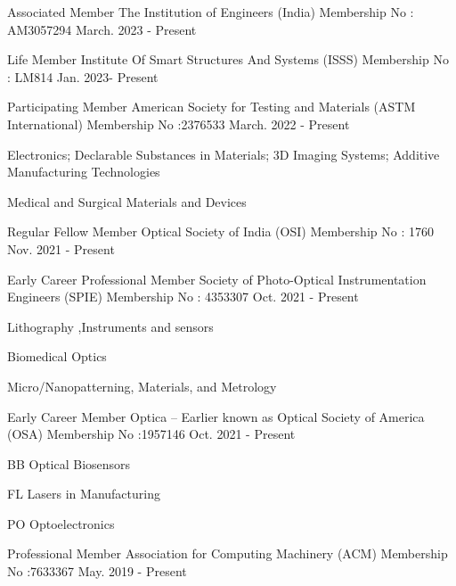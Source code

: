 \begin{cventries}
\cventry
    { Associated Member}
    { The Institution of Engineers (India)}
    {Membership No : AM3057294}
    {March. 2023 - Present}
{
	 \begin{cvitems}
	\end{cvitems}
}
\cventry
    { Life Member}
    { Institute Of Smart Structures And Systems (ISSS)}
    {Membership No : LM814 }
    {Jan. 2023- Present}
{
	 \begin{cvitems}
	\end{cvitems}
}
\cventry
    {Participating Member }
    { American Society for Testing and Materials (ASTM International)}
    {Membership No :2376533 }
    {March. 2022 - Present}
{
	 \begin{cvitems}
	\item {Electronics; Declarable Substances in Materials; 3D Imaging Systems; Additive Manufacturing Technologies}
	\item {Medical and Surgical Materials and Devices}
	\end{cvitems}
}
\cventry
    {Regular Fellow Member }
    { Optical Society of India (OSI)}
    {Membership No : 1760}
    {Nov. 2021 - Present}
{
 \begin{cvitems}
\end{cvitems}
}
\cventry
    {Early Career Professional Member}
    {Society of Photo-Optical Instrumentation Engineers (SPIE)}
    {Membership No : 4353307}
    {Oct. 2021 - Present}
{
 \begin{cvitems}
\item {Lithography ,Instruments and sensors   }
\item {Biomedical Optics  }
\item {Micro/Nanopatterning, Materials, and Metrology }
\end{cvitems}
}
\cventry
    {Early Career	 Member}
    {Optica – Earlier known as Optical Society of America (OSA)}
    {Membership No :1957146 }
    {Oct. 2021 - Present}
{
 \begin{cvitems}
\item {BB Optical Biosensors   }
\item {FL Lasers in Manufacturing }
\item {PO Optoelectronics }
\end{cvitems}
}
\cventry
    {Professional Member}
    {Association for Computing Machinery (ACM)}
    {Membership No :7633367 }
    {May. 2019 - Present}
{
 \begin{cvitems}

\end{cvitems}}
\end{cventries}
